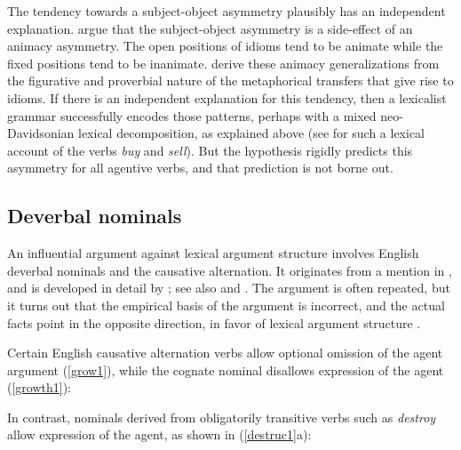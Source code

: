 The tendency towards a subject-object asymmetry plausibly has an independent explanation.
\citet*{NSW94a} argue that the subject-object asymmetry is a side-effect of an animacy asymmetry.
The open positions of idioms tend to be animate while the fixed positions tend to be inanimate.
\citet{NSW94a} derive these animacy generalizations from the figurative and proverbial nature of the
metaphorical transfers that give rise to idioms.  If there is an independent explanation for this
tendency, then a lexicalist grammar successfully encodes those patterns, perhaps with a mixed
neo-Davidsonian lexical decomposition, as explained above (see \citet{Wechsler2005a} for such a
lexical account of the verbs \emph{buy} and \emph{sell}).  But the \littlev hypothesis rigidly
predicts this asymmetry for all agentive verbs, and that prediction is not borne out.

\subsection{Deverbal nominals}
\label{deverbal-sec}

An influential argument against lexical argument structure involves English deverbal nominals and
the causative alternation.  It originates from a mention in \citet{Chomsky70a}, and is developed in
detail by \citet{Marantz97a}; see also \citet{Pesetsky95a-u} and \citet{HN2000a}.  The argument is
often repeated, but it turns out that the empirical basis of the argument is incorrect, and the
actual facts point in the opposite direction, in favor of lexical argument structure
\citep{Wechsler2008b, Wechsler2008a}.

Certain English causative alternation verbs allow optional omission of the agent argument  (\ref{grow1}), while the cognate nominal disallows expression of the agent (\ref{growth1}):
\eal
\label{grow1}
\zl

\eal
\label{growth1}
\zl
%
In contrast, nominals derived from obligatorily transitive verbs such as \emph{destroy} allow expression of the agent, as shown in (\ref{destruc1}a):  

\eal
\label{destroy1}
\zl

\eal
\label{destruc1}
\zl

